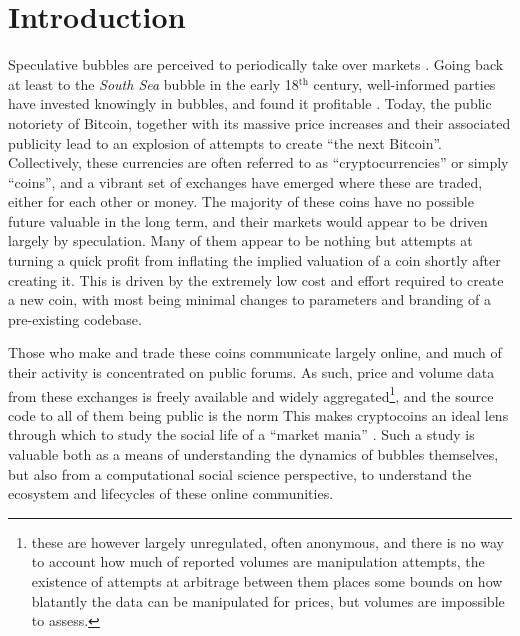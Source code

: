 \section{Introduction}

Speculative bubbles are perceived to periodically take over markets \cite{garber2001famous}.
Going back at least to the \emph{South Sea} bubble in the early 18$^{\text{th}}$ century, well-informed parties  have invested knowingly in bubbles, and found it profitable \cite{temin2004riding}.
Today, the public notoriety of Bitcoin, together with its massive price increases and their associated publicity lead to an explosion of attempts to create ``the next Bitcoin''.
Collectively, these currencies are often referred to as ``cryptocurrencies'' or simply ``coins'', and a vibrant set of exchanges have emerged where these are traded, either for each other or money.
The majority of these coins have no possible future valuable in the long term, and their markets would appear to be driven largely by speculation.
Many of them appear to be nothing but attempts at turning a quick profit from inflating the implied valuation of a coin shortly after creating it.
This is driven by the extremely low cost and effort required to create a new coin, with most being minimal changes to parameters and branding of a pre-existing codebase.

Those who make and trade these coins communicate largely online, and much of their activity is concentrated on public forums. 
As such, price and volume data from these exchanges is freely available and widely aggregated\footnote{ these are however largely unregulated, often anonymous, and there is no way to account how much of reported volumes are manipulation attempts, the existence of attempts at arbitrage between them places some bounds on how blatantly the data can be manipulated for prices, but volumes are impossible to assess. },
and the source code to all of them being public is the norm%
This makes cryptocoins
an ideal lens through which to study the social life of a ``market mania'' \cite{cosma2008}.
Such a study is valuable both as a means of understanding the dynamics of bubbles themselves, but also from a computational social science perspective, to understand the ecosystem and lifecycles of these online communities.


